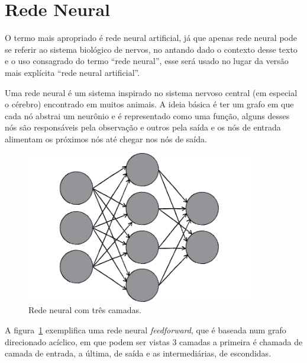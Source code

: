 \section{Rede Neural}

O termo mais apropriado é rede neural artificial, já que apenas rede
neural pode se referir ao sistema biológico de nervos, no antando dado o
contexto desse texto e o uso consagrado do termo ``rede neural'', esse
será usado no lugar da versão mais explícita ``rede neural artificial''.

Uma rede neural é um sistema inspirado no sistema nervoso central (em
especial o cérebro) encontrado em muitos animais. A ideia básica é ter
um grafo em que cada nó abstrai um neurônio e é representado como uma
função, alguns desses nós são responsáveis pela observação e outros pela
saída e os nós de entrada alimentam os próximos nós até chegar nos nós
de saída. \cite{haykin2001redes}



\begin{figure}[ht]
\centering
\includegraphics[width=10cm]{figuras/rede_neural_grafo}
\caption{Rede neural com três camadas.}\label{fig:rede_neural_grafo}
\end{figure}

A figura~\ref{fig:rede_neural_grafo} exemplifica uma rede neural \emph{feedforward},
que é baseada num grafo direcionado acíclico, em que podem ser vistas 3 camadas
a primeira é chamada de camada de entrada, a última, de saída e as intermediárias,
de escondidas. \cite{shiffman2012nature}

